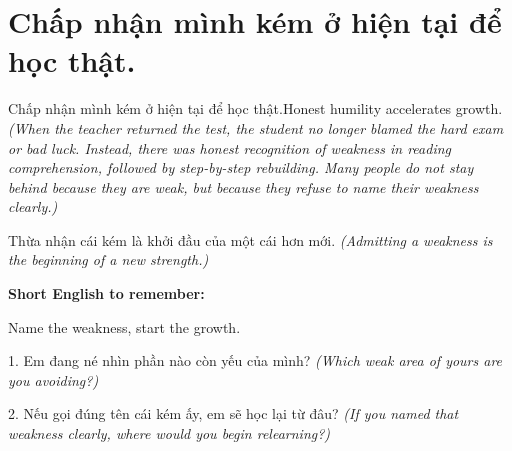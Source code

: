 \section{Chấp nhận mình kém ở hiện tại để học thật.}
\begin{truyen}{Chấp nhận mình kém ở hiện tại để học thật.}{Honest humility accelerates growth.}
\textit{(When the teacher returned the test, the student no longer blamed the hard exam or bad luck. Instead, there was honest recognition of weakness in reading comprehension, followed by step-by-step rebuilding. Many people do not stay behind because they are weak, but because they refuse to name their weakness clearly.)}
\end{truyen}
\begin{baihoc}
Thừa nhận cái kém là khởi đầu của một cái hơn mới.
\textit{(Admitting a weakness is the beginning of a new strength.)}
\end{baihoc}
\begin{ghinhoanh}
\textbf{Short English to remember:}

Name the weakness, start the growth.
\end{ghinhoanh}
\begin{tuhocnhanh}
1. Em đang né nhìn phần nào còn yếu của mình? \textit{(Which weak area of yours are you avoiding?)}

2. Nếu gọi đúng tên cái kém ấy, em sẽ học lại từ đâu? \textit{(If you named that weakness clearly, where would you begin relearning?)}
\end{tuhocnhanh}
\ngancach

